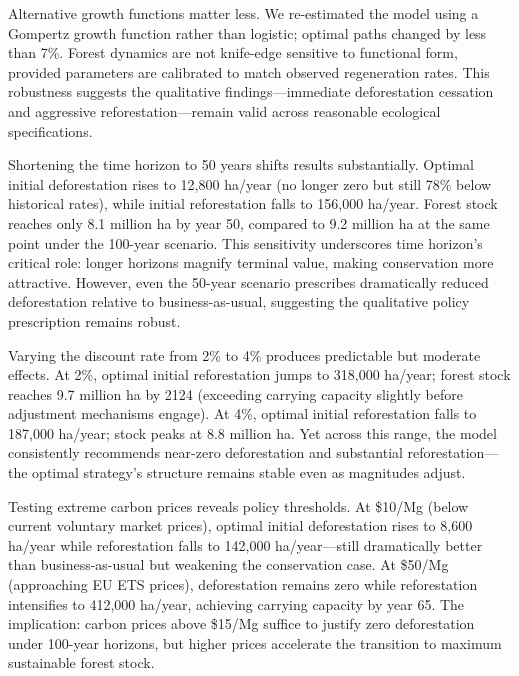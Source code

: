 Alternative growth functions matter less. We re-estimated the model using a Gompertz growth function rather than logistic; optimal paths changed by less than 7\%. Forest dynamics are not knife-edge sensitive to functional form, provided parameters are calibrated to match observed regeneration rates. This robustness suggests the qualitative findings—immediate deforestation cessation and aggressive reforestation—remain valid across reasonable ecological specifications.

Shortening the time horizon to 50 years shifts results substantially. Optimal initial deforestation rises to 12,800 ha/year (no longer zero but still 78\% below historical rates), while initial reforestation falls to 156,000 ha/year. Forest stock reaches only 8.1 million ha by year 50, compared to 9.2 million ha at the same point under the 100-year scenario. This sensitivity underscores time horizon's critical role: longer horizons magnify terminal value, making conservation more attractive. However, even the 50-year scenario prescribes dramatically reduced deforestation relative to business-as-usual, suggesting the qualitative policy prescription remains robust.

Varying the discount rate from 2\% to 4\% produces predictable but moderate effects. At 2\%, optimal initial reforestation jumps to 318,000 ha/year; forest stock reaches 9.7 million ha by 2124 (exceeding carrying capacity slightly before adjustment mechanisms engage). At 4\%, optimal initial reforestation falls to 187,000 ha/year; stock peaks at 8.8 million ha. Yet across this range, the model consistently recommends near-zero deforestation and substantial reforestation—the optimal strategy's structure remains stable even as magnitudes adjust.

Testing extreme carbon prices reveals policy thresholds. At \$10/Mg (below current voluntary market prices), optimal initial deforestation rises to 8,600 ha/year while reforestation falls to 142,000 ha/year—still dramatically better than business-as-usual but weakening the conservation case. At \$50/Mg (approaching EU ETS prices), deforestation remains zero while reforestation intensifies to 412,000 ha/year, achieving carrying capacity by year 65. The implication: carbon prices above \$15/Mg suffice to justify zero deforestation under 100-year horizons, but higher prices accelerate the transition to maximum sustainable forest stock.
